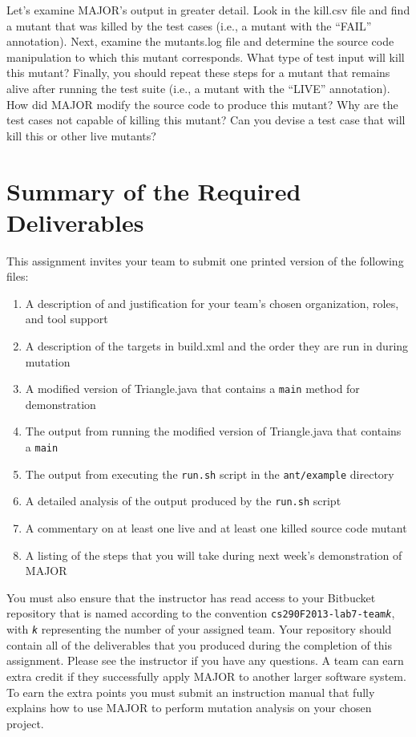 Let's examine MAJOR's output in greater detail. Look in the kill.csv file and find a mutant that was killed by the test
cases (i.e., a mutant with the ``FAIL'' annotation). Next, examine the mutants.log file and determine the source code
manipulation to which this mutant corresponds.  What type of test input will kill this mutant?  Finally, you should
repeat these steps for a mutant that remains alive after running the test suite (i.e., a mutant with the ``LIVE''
annotation). How did MAJOR modify the source code to produce this mutant? Why are the test cases not capable of killing
this mutant?  Can you devise a test case that will kill this or other live mutants?

\section*{Summary of the Required Deliverables}

This assignment invites your team to submit one printed version of the following files:
\vspace*{-.1in}
\begin{enumerate}
	\itemsep0em 
	\item A description of and justification for your team's chosen organization, roles, and tool support
	\item A description of the targets in build.xml and the order they are run in during mutation 
	\item A modified version of Triangle.java that contains a {\tt main} method for demonstration
	\item The output from running the modified version of Triangle.java that contains a {\tt main}
	\item The output from executing the {\tt run.sh} script in the {\tt ant/example} directory
	\item A detailed analysis of the output produced by the {\tt run.sh} script
	\item A commentary on at least one live and at least one killed source code mutant
	\item A listing of the steps that you will take during next week's demonstration of MAJOR
\end{enumerate}
\vspace*{-.1in}

You must also ensure that the instructor has read access to your Bitbucket repository that is named according to the
convention {\tt cs290F2013-lab7-team{\em k}}, with {\tt {\em k}} representing the number of your assigned team.  Your
repository should contain all of the deliverables that you produced during the completion of this assignment.  Please
see the instructor if you have any questions. A team can earn extra credit if they successfully apply MAJOR to another
larger software system. To earn the extra points you must submit an instruction manual that fully explains how to use
MAJOR to perform mutation analysis on your chosen project.


